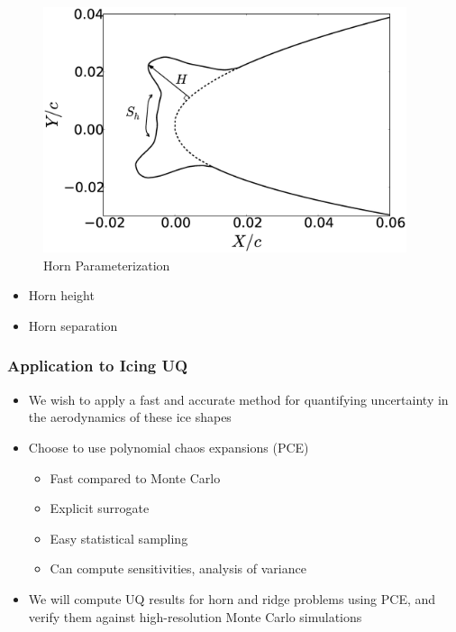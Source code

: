 \documentclass[9pt]{beamer}
\begin{document}
\begin{frame}
\begin{minipage}[t]{0.45\linewidth}
\begin{figure}[t]
\includegraphics[width=0.95\textwidth]{NominalHorn}
\caption{Horn Parameterization}
\end{figure}
\vspace{-0.5cm}
\begin{itemize}
\item Horn height
\item Horn separation
\end{itemize}
\end{minipage}
\end{frame}
\begin{frame}
\frametitle{Application to Icing UQ}
\label{sec-2-3}

\begin{itemize}
\item We wish to apply a fast and accurate method for quantifying
  uncertainty in the aerodynamics of these ice shapes
\item Choose to use polynomial chaos expansions (PCE)
\begin{itemize}
\item Fast compared to Monte Carlo
\item Explicit surrogate
\item Easy statistical sampling
\item Can compute sensitivities, analysis of variance
\end{itemize}
\item We will compute UQ results for horn and ridge problems using PCE,
  and verify them against high-resolution Monte Carlo simulations
\end{itemize}
\end{frame}
\end{document}
